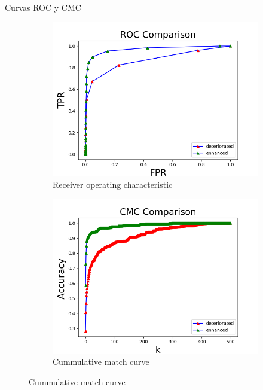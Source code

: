\documentclass[12pt,aspectratio=169]{beamer}
\begin{document}
\begin{frame}{Curvas ROC y CMC}

    \begin{figure}
        \begin{subfigure}{0.48\textwidth}
            \centering
            \includegraphics[scale=0.45]{figs/roc_comparison.png}
            \caption{Receiver operating characteristic}
        \end{subfigure}
        \begin{subfigure}{0.48\textwidth}
            \centering
            \includegraphics[scale=0.45]{figs/cmc_comparison.png}
            \caption{Cummulative match curve}
        \end{subfigure}
    \end{figure}

\end{frame}
\end{document}
